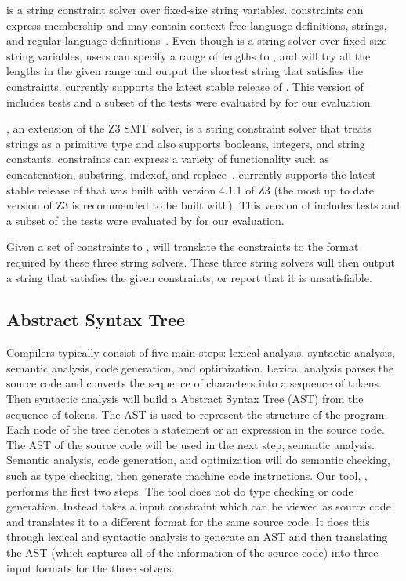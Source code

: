 \hampi is a string constraint solver over fixed-size string variables. \hampi constraints can express
membership and may contain context-free language definitions, strings, and regular-language
definitions~\cite{hampi2009}. Even though \hampi is a string solver over fixed-size string variables,
users can specify a range of lengths to \hampi, and \hampi will try all the lengths in the given range
and output the shortest string that satisfies the constraints.
\imss currently supports the latest stable release of \hampi. This version of \hampi
includes \hampitests tests and a subset of the \hampitests tests were evaluated by \imss for our evaluation.

\zstr, an extension of the Z3 SMT solver, is a string constraint solver that treats strings
as a primitive type and also supports booleans, integers, and string constants.
\zstr constraints can express a variety of functionality such as concatenation, substring,
indexof, and replace~\cite{z32013}.
\imss currently supports the latest stable release of \zstr that was built with version
4.1.1 of Z3 (the most up to date version of Z3 \zstr is recommended to be built with).
This version of \zstr
includes \ztests tests and a subset of the \ztests tests were evaluated by \imss for our evaluation.

Given a set of constraints to \imss, \imss will translate the constraints to the format required by these three string solvers. These three string solvers will then output a string that satisfies the given constraints, or report that it is unsatisfiable.

\subsection{Abstract Syntax Tree}
Compilers typically consist of five main steps: lexical analysis, syntactic analysis, semantic
analysis, code generation, and optimization. Lexical analysis parses the source code and converts the
sequence of characters into a sequence of tokens. Then syntactic analysis will build a
Abstract Syntax Tree (AST) from the sequence of tokens. The AST is used to represent the structure
of the program. Each node of the tree denotes a statement or an expression in the source code.
The AST of the source code will be used in the next step, semantic analysis.
Semantic analysis, code generation, and optimization will do semantic checking, such as type checking,
then generate machine code instructions. Our tool, \imss, performs the first two steps.
The tool does not do type checking or code generation. Instead \imss takes a input constraint which can be
viewed as source code and translates it to a different format for the same source code.
It does this through lexical and syntactic analysis to generate an AST and then translating the AST (which captures all of the information of the source code) into three input formats
for the three solvers.
